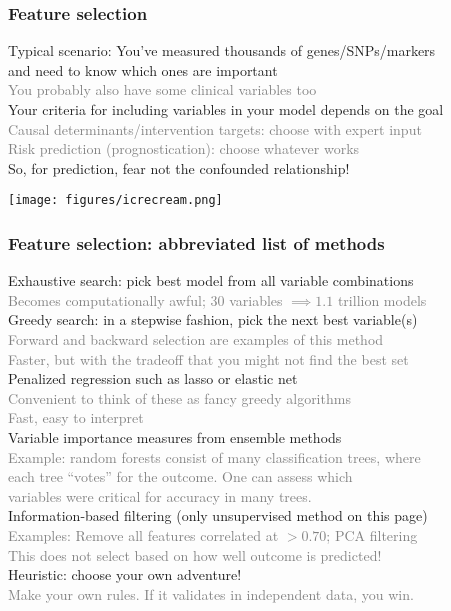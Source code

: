 \documentclass{beamer}
\newcommand{\si}[1]{\hspace{.5cm} \textcolor{gray} {#1}\\}
\newcommand{\sicont}[1]{\hspace{1cm} \textcolor{gray} {#1}\\}
\begin{document}
{\begin{frame}[t]
\frametitle{Feature selection}
Typical scenario: You've measured thousands of genes/SNPs/markers\\
\hspace{.5cm} and need to know which ones are important\\
\si{You probably also have some clinical variables too}
\vspace{.2cm}
Your criteria for including variables in your model depends on the goal\\
\si{Causal determinants/intervention targets: choose with expert input}
\si{Risk prediction (prognostication): choose whatever works}
\vspace{.2cm}
So, for prediction, fear not the confounded relationship!\\
\begin{center}
\texttt{[image: figures/icrecream.png]}
\end{center}
\end{frame}

\begin{frame}[t]
\frametitle{Feature selection: abbreviated list of methods}
Exhaustive search: pick best model from all variable combinations\\
\si{Becomes computationally awful; 30 variables $\implies 1.1$ trillion models}
\vspace{.2cm}
Greedy search: in a stepwise fashion, pick the next best variable(s)\\
\si{Forward and backward selection are examples of this method}
\si{Faster, but with the tradeoff that you might not find the best set}
\vspace{.2cm}
Penalized regression such as lasso or elastic net\\
\si{Convenient to think of these as fancy greedy algorithms}
\si{Fast, easy to interpret}
\vspace{.2cm}
Variable importance measures from ensemble methods\\
\si{Example: random forests consist of many classification trees, where}
\sicont{each tree ``votes'' for the outcome. One can assess which}
\sicont{variables were critical for accuracy in many trees.}
\vspace{.2cm}
Information-based filtering (only unsupervised method on this page)\\
\si{Examples: Remove all features correlated at $>0.70$; PCA filtering}
\si{This does not select based on how well outcome is predicted!}
\vspace{.2cm}
Heuristic: choose your own adventure!\\
\si{Make your own rules. If it validates in independent data, you win.}
\end{frame}

}
\end{document}
